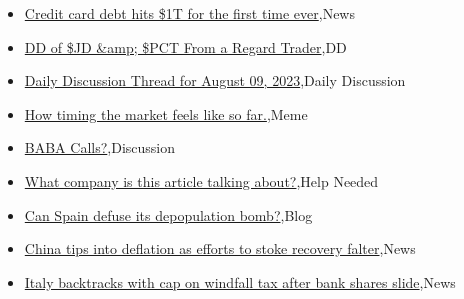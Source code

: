 \documentclass{article}%
\begin{document}
%
\begin{itemize}%
\item%
\href{https://reddit.com/r/wallstreetbets/comments/15mb9z2/credit\_card\_debt\_hits\_1t\_for\_the\_first\_time\_ever/}{Credit card debt hits \$1T for the first time ever},News%
\item%
\href{https://reddit.com/r/wallstreetbets/comments/15mb10q/dd\_of\_jd\_pct\_from\_a\_regard\_trader/}{DD of \$JD \&amp; \$PCT From a Regard Trader},DD%
\item%
\href{https://reddit.com/r/wallstreetbets/comments/15maw2v/daily\_discussion\_thread\_for\_august\_09\_2023/}{Daily Discussion Thread for August 09, 2023},Daily Discussion%
\item%
\href{https://reddit.com/r/wallstreetbets/comments/15ma08k/how\_timing\_the\_market\_feels\_like\_so\_far/}{How timing the market feels like so far.},Meme%
\item%
\href{https://reddit.com/r/StockMarket/comments/15lz63d/baba\_calls/}{BABA Calls?},Discussion%
\item%
\href{https://reddit.com/r/StockMarket/comments/15lu2dt/what\_company\_is\_this\_article\_talking\_about/}{What company is this article talking about?},Help Needed%
\item%
\href{https://reddit.com/r/Economics/comments/15m9iky/can\_spain\_defuse\_its\_depopulation\_bomb/}{Can Spain defuse its depopulation bomb?},Blog%
\item%
\href{https://reddit.com/r/Economics/comments/15m93gu/china\_tips\_into\_deflation\_as\_efforts\_to\_stoke/}{China tips into deflation as efforts to stoke recovery falter},News%
\item%
\href{https://reddit.com/r/Economics/comments/15m7fle/italy\_backtracks\_with\_cap\_on\_windfall\_tax\_after/}{Italy backtracks with cap on windfall tax after bank shares slide},News%
\end{itemize}%
\end{document}
